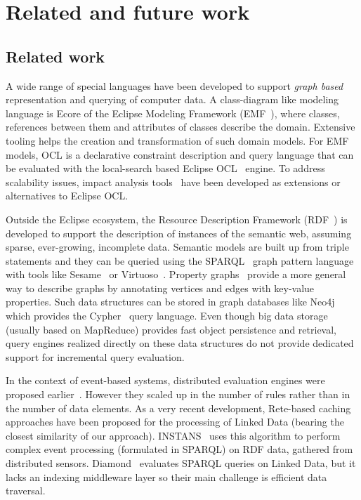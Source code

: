 \chapter{Related and future work}
\label{chap:related-work}

\section{Related work}
\label{sec:relwork}

A wide range of special languages have been developed to support \emph{graph based} representation and querying of computer data. A class-diagram like modeling language is Ecore of the Eclipse Modeling Framework (EMF~\cite{EMF}), where classes, references between them and attributes of classes describe the domain. Extensive tooling helps the creation and transformation of such domain models. For EMF models, OCL is a declarative constraint description and query language that can be evaluated with the local-search based Eclipse OCL~\cite{EclipseOCL} engine. To address scalability issues, impact analysis tools~\cite{OCLIA} have been developed as extensions or alternatives to Eclipse OCL.

Outside the Eclipse ecosystem, the Resource Description Framework (RDF~\cite{website:rdf_standard}) is developed to support the description of instances of the semantic web, assuming sparse, ever-growing, incomplete data. Semantic models are built up from triple statements and they can be queried using the SPARQL~\cite{SPARQL} graph pattern language with tools like Sesame~\cite{sesame} or Virtuoso~\cite{openvirtuoso}. Property graphs~\cite{DBLP:journals/corr/abs-1006-2361} provide a more general way to describe graphs by annotating vertices and edges with key-value properties. Such data structures can be stored in graph databases like Neo4j~\cite{neo4j} which provides the Cypher~\cite{cypher} query language. Even though big data storage (usually based on MapReduce) provides fast object persistence and retrieval, query engines realized directly on these data structures do not provide dedicated support for incremental query evaluation. 

In the context of event-based systems, distributed evaluation engines were proposed earlier~\cite{message-passing-rete}. However they scaled up in the number of rules \cite{mapreduce-rete} rather than in the number of data elements. As a very recent development, Rete-based caching approaches have been proposed for the processing of Linked Data (bearing the closest similarity of our approach). INSTANS~\cite{INSTANS2012} uses this algorithm to perform complex event processing (formulated in SPARQL) on RDF data, gathered from distributed sensors. Diamond~\cite{miranker2012diamond} evaluates SPARQL queries on Linked Data, but it lacks an indexing middleware layer so their main challenge is efficient data traversal.

